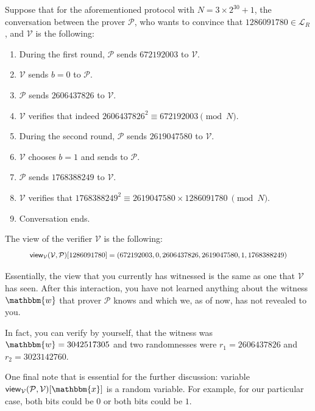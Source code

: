 \documentclass[../lecture-notes-148x210.tex]{subfiles}
\begin{document}
\begin{example}
    Suppose that for the aforementioned protocol with $N=3 \times 2^{30} + 1$,
    the conversation between the prover $\mathcal{P}$, who wants to convince
    that $1286091780 \in \mathcal{L}_R$, and $\mathcal{V}$ is the following:
    \begin{enumerate} %
        \item During the first round, $\mathcal{P}$ sends $672192003$ to $\mathcal{V}$.
        \item $\mathcal{V}$ sends $b=0$ to $\mathcal{P}$.
        \item $\mathcal{P}$ sends $2606437826$ to $\mathcal{V}$.
        \item $\mathcal{V}$ verifies that indeed $2606437826^2 \equiv 672192003 \pmod{N}$.
        \item During the second round, $\mathcal{P}$ sends $2619047580$ to $\mathcal{V}$.
        \item $\mathcal{V}$ chooses $b=1$ and sends to $\mathcal{P}$.
        \item $\mathcal{P}$ sends $1768388249$ to $\mathcal{V}$.
        \item $\mathcal{V}$ verifies that $1768388249^2 \equiv 2619047580 \times 1286091780~\pmod{N}$.
        \item Conversation ends.
    \end{enumerate}

    The view of the verifier $\mathcal{V}$ is the following: 
    \begin{equation*}
        \scalebox{0.85}{
            $\mathsf{view}_{\mathcal{V}}(\mathcal{V}, \mathcal{P})[1286091780] = (672192003, 0, 2606437826, 2619047580, 1, 1768388249)$
        }
    \end{equation*}

    Essentially, the view that you currently has witnessed is the same as one
    that $\mathcal{V}$ has seen. After this interaction, you have not learned
    anything about the witness $\mathbbm{w}$ that prover $\mathcal{P}$ knows and
    which we, as of now, has not revealed to you.

    In fact, you can verify by yourself, that the witness was $\mathbbm{w} =
    3042517305$ and two randomnesses were $r_1 = 2606437826$ and $r_2 =
    3023142760$.

    One final note that is essential for the further discussion: variable
    $\mathsf{view}_{\mathcal{V}}(\mathcal{P}, \mathcal{V})[\mathbbm{x}]$ is a
    random variable. For example, for our particular case, both bits could be
    $0$ or both bits could be $1$. 
\end{example}
\end{document}
